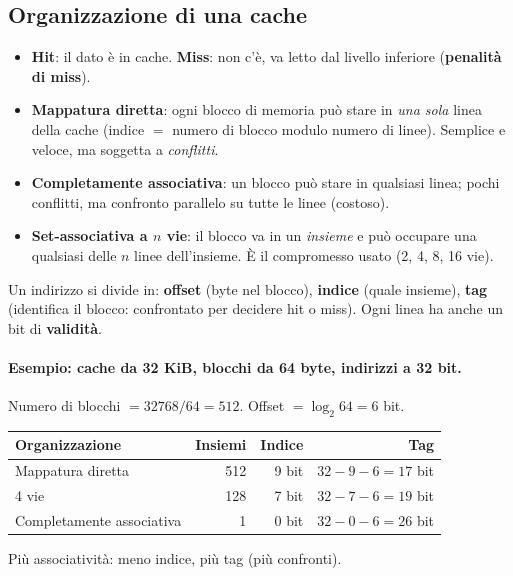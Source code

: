 \subsection{Organizzazione di una cache}
\begin{itemize}
    \item \textbf{Hit}: il dato è in cache. \textbf{Miss}: non c'è, va letto dal livello inferiore (\textbf{penalità di miss}).
    \item \textbf{Mappatura diretta}: ogni blocco di memoria può stare in \emph{una sola} linea della cache (indice $=$ numero di blocco modulo numero di linee). Semplice e veloce, ma soggetta a \emph{conflitti}.
    \item \textbf{Completamente associativa}: un blocco può stare in qualsiasi linea; pochi conflitti, ma confronto parallelo su tutte le linee (costoso).
    \item \textbf{Set-associativa a $n$ vie}: il blocco va in un \emph{insieme} e può occupare una qualsiasi delle $n$ linee dell'insieme. È il compromesso usato (2, 4, 8, 16 vie).
\end{itemize}
Un indirizzo si divide in: \textbf{offset} (byte nel blocco), \textbf{indice} (quale insieme), \textbf{tag} (identifica il blocco: confrontato per decidere hit o miss). Ogni linea ha anche un bit di \textbf{validità}.

\paragraph{Esempio: cache da 32 KiB, blocchi da 64 byte, indirizzi a 32 bit.}
Numero di blocchi $= 32768/64 = 512$. Offset $= \log_2 64 = 6$ bit.
\begin{center}
\small
\begin{tabular}{@{}lrrr@{}}
\toprule
\textbf{Organizzazione} & \textbf{Insiemi} & \textbf{Indice} & \textbf{Tag} \\
\midrule
Mappatura diretta & 512 & 9 bit & $32-9-6=17$ bit \\
4 vie & 128 & 7 bit & $32-7-6=19$ bit \\
Completamente associativa & 1 & 0 bit & $32-0-6=26$ bit \\
\bottomrule
\end{tabular}
\end{center}
Più associatività: meno indice, più tag (più confronti).


